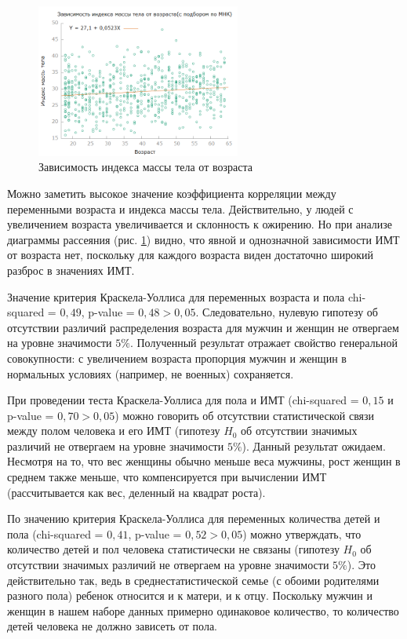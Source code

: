 \documentclass[a4paper,12pt]{article}
\begin{document}
\begin{figure}[H]
	\includegraphics[width=0.6\textwidth]{../[graphics]/bmi-age.png}
	\centering
	\caption{Зависимость индекса массы тела от возраста}
	\label{fig:bmi-age}
\end{figure}

Можно заметить высокое значение коэффициента корреляции между переменными возраста и индекса массы тела. Действительно, у людей с увеличением возраста увеличивается и склонность к ожирению. Но при анализе диаграммы рассеяния (рис. \ref{fig:bmi-age}) видно, что явной и однозначной зависимости ИМТ от возраста нет, поскольку для каждого возраста виден достаточно широкий разброс в значениях ИМТ.
	
Значение критерия Краскела-Уоллиса для переменных возраста и пола chi-squared = $0,49$, p-value = $0,48 > 0,05$. Следовательно, нулевую гипотезу об отсутствии различий распределения возраста для мужчин и женщин не отвергаем на уровне значимости $5\%$. Полученный результат отражает свойство генеральной совокупности: с увеличением возраста пропорция мужчин и женщин в нормальных условиях (например, не военных) сохраняется. 

При проведении теста Краскела-Уоллиса для пола и ИМТ (chi-squared = $0,15$ и p-value = $0,70 > 0,05$) можно говорить об отсутствии статистической связи между полом человека и его ИМТ (гипотезу $H_0$ об отсутствии значимых различий не отвергаем на уровне значимости $5\%$). Данный результат ожидаем. Несмотря на то, что вес женщины обычно меньше веса мужчины, рост женщин в среднем также меньше, что компенсируется при вычислении ИМТ (рассчитывается как вес, деленный на квадрат роста).

По значению критерия Краскела-Уоллиса для переменных количества детей и пола (chi-squared = $0,41$,  p-value = $0,52 > 0,05$) можно утверждать, что количество детей и пол человека статистически не связаны (гипотезу $H_0$ об отсутствии значимых различий не отвергаем на уровне значимости $5\%$). Это действительно так, ведь в среднестатистической семье (с обоими родителями разного пола) ребенок относится и к матери, и к отцу. Поскольку мужчин и женщин в нашем наборе данных примерно одинаковое количество, то количество детей человека не должно зависеть от пола.
\end{document}
